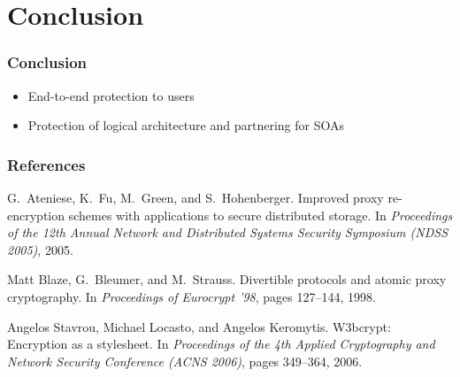\documentclass{beamer}
\begin{document}
\section{Conclusion}
\begin{frame}
\frametitle{Conclusion}
\begin{itemize}
\item End-to-end protection to users 
\item Protection of logical architecture and partnering for SOAs
\end{itemize}
\end{frame}

\begin{thebibliography}{10}
\frametitle{References}
G.~Ateniese, K.~Fu, M.~Green, and S.~Hohenberger.
\newblock Improved proxy re-encryption schemes with applications to secure
  distributed storage.
\newblock In {\em Proceedings of the 12th Annual Network and Distributed
  Systems Security Symposium (NDSS 2005)}, 2005.

Matt Blaze, G.~Bleumer, and M.~Strauss.
\newblock Divertible protocols and atomic proxy cryptography.
\newblock In {\em Proceedings of Eurocrypt '98}, pages 127--144, 1998.

Angelos Stavrou, Michael Locasto, and Angelos Keromytis.
\newblock W3bcrypt: Encryption as a stylesheet.
\newblock In {\em Proceedings of the 4th Applied Cryptography and Network
  Security Conference (ACNS 2006)}, pages 349--364, 2006.

\end{thebibliography}
\end{document}
